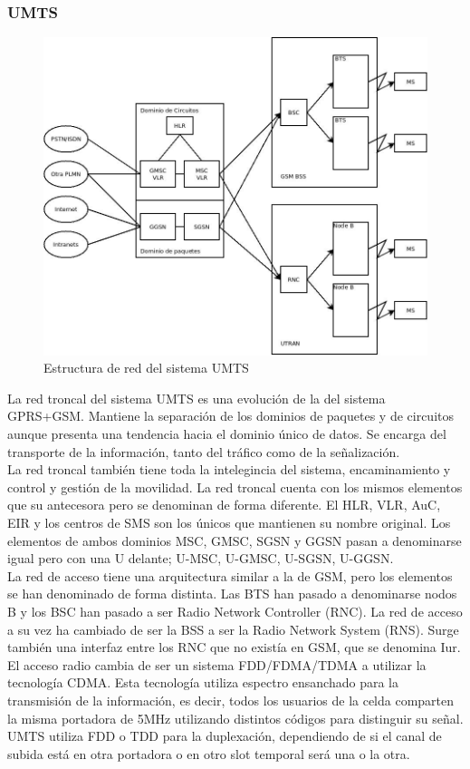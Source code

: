 \subsubsection{UMTS}
\label{ssub:UMTS}
\begin{figure}[H]
\centering
\includegraphics[width=\textwidth]{Imagen/diaUMTS.jpg}
\caption{Estructura de red del sistema UMTS}
\label{img:UMTS}
\end{figure}
La red troncal del sistema UMTS es una evolución de la del sistema GPRS+GSM. Mantiene la separación de los dominios de paquetes y de circuitos aunque presenta una tendencia hacia el dominio único de datos. Se encarga del transporte de la información, tanto del tráfico como de la señalización.\\
La red troncal también tiene toda la intelegincia del sistema, encaminamiento y control y gestión de la movilidad. La red troncal cuenta con los mismos elementos que su antecesora pero se denominan de forma diferente. El HLR, VLR, AuC, EIR y los centros de SMS son los únicos que mantienen su nombre original. Los elementos de ambos dominios MSC, GMSC, SGSN y GGSN pasan a denominarse igual pero con una U delante; U-MSC, U-GMSC, U-SGSN, U-GGSN.\\
La red de acceso tiene una arquitectura similar a la de GSM, pero los elementos se han denominado de forma distinta. Las BTS han pasado a denominarse nodos B y los BSC han pasado a ser Radio Network Controller (RNC). La red de acceso a su vez ha cambiado de ser la BSS a ser la Radio Network System (RNS). Surge también una interfaz entre los RNC que no existía en GSM, que se denomina Iur. El acceso radio cambia de ser un sistema FDD/FDMA/TDMA a utilizar la tecnología CDMA. Esta tecnología utiliza espectro ensanchado para la transmisión de la información, es decir, todos los usuarios de la celda comparten la misma portadora de 5MHz utilizando distintos códigos para distinguir su señal. UMTS utiliza FDD o TDD para la duplexación, dependiendo de si el canal de subida está en otra portadora o en otro slot temporal será una o la otra.
